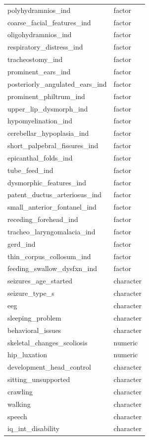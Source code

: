 \documentclass[
  letterpaper,
  DIV=11,
  numbers=noendperiod]{scrartcl}
\begin{document}
\begin{longtable}{ll}
polyhydramnios\_ind & factor \\ 
coarse\_facial\_features\_ind & factor \\ 
oligohydramnios\_ind & factor \\ 
respiratory\_distress\_ind & factor \\ 
tracheostomy\_ind & factor \\ 
prominent\_ears\_ind & factor \\ 
posteriorly\_angulated\_ears\_ind & factor \\ 
prominent\_philtrum\_ind & factor \\ 
upper\_lip\_dysmorph\_ind & factor \\ 
hypomyelination\_ind & factor \\ 
cerebellar\_hypoplasia\_ind & factor \\ 
short\_palpebral\_fissures\_ind & factor \\ 
epicanthal\_folds\_ind & factor \\ 
tube\_feed\_ind & factor \\ 
dysmorphic\_features\_ind & factor \\ 
patent\_ductus\_arteriosus\_ind & factor \\ 
small\_anterior\_fontanel\_ind & factor \\ 
receding\_forehead\_ind & factor \\ 
tracheo\_laryngomalacia\_ind & factor \\ 
gerd\_ind & factor \\ 
thin\_corpus\_collosum\_ind & factor \\ 
feeding\_swallow\_dysfxn\_ind & factor \\ 
seizures\_age\_started & character \\ 
seizure\_type\_s & character \\ 
eeg & character \\ 
sleeping\_problem & character \\ 
behavioral\_issues & character \\ 
skeletal\_changes\_scoliosis & numeric \\ 
hip\_luxation & numeric \\ 
development\_head\_control & character \\ 
sitting\_unsupported & character \\ 
crawling & character \\ 
walking & character \\ 
speech & character \\ 
iq\_int\_disability & character \\ 

\end{longtable}
\end{document}
